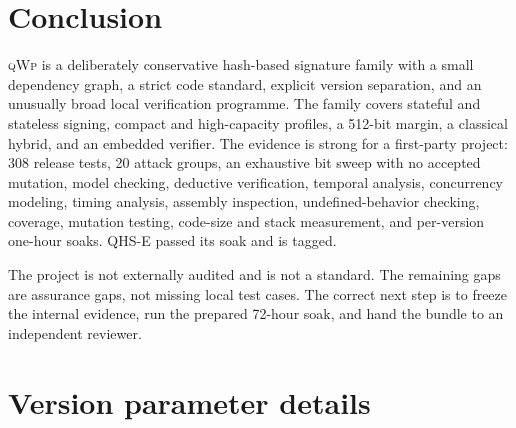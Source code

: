 \documentclass[11pt,a4paper]{article}
\newcommand{\qwp}{\textsc{qWp}}
\begin{document}
\section{Conclusion}

\qwp{} is a deliberately conservative hash-based signature family with a
small dependency graph, a strict code standard, explicit version separation,
and an unusually broad local verification programme. The family covers
stateful and stateless signing, compact and high-capacity profiles, a 512-bit
margin, a classical hybrid, and an embedded verifier. The evidence is strong
for a first-party project: 308 release tests, 20 attack groups, an exhaustive
bit sweep with no accepted mutation, model checking, deductive verification,
temporal analysis, concurrency modeling, timing analysis, assembly inspection,
undefined-behavior checking, coverage, mutation testing, code-size and stack
measurement, and per-version one-hour soaks. QHS-E passed its soak and is
tagged.

The project is not externally audited and is not a standard. The remaining
gaps are assurance gaps, not missing local test cases. The correct next step is
to freeze the internal evidence, run the prepared 72-hour soak, and hand the
bundle to an independent reviewer.

\appendix

\section{Version parameter details}
\end{document}
